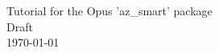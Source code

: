 \documentclass[fleqn]{howto}
\begin{document}
\begin{center}
{\Large Tutorial for the Opus 'az_smart' package}\\[5mm]
{\large Draft}\\[2mm]
\today
\end{center}
\end{document}
